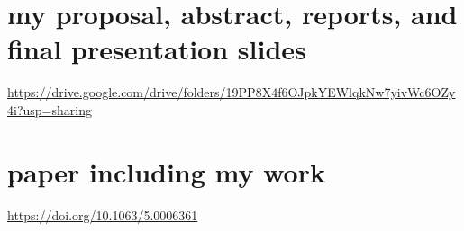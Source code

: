 \documentclass{article}
\begin{document}
\section{my proposal, abstract, reports, and final presentation slides}
\url{https://drive.google.com/drive/folders/19PP8X4f6OJpkYEWlqkNw7yivWc6OZy4i?usp=sharing}
\section{paper including my work}
\url{https://doi.org/10.1063/5.0006361}
\end{document}
